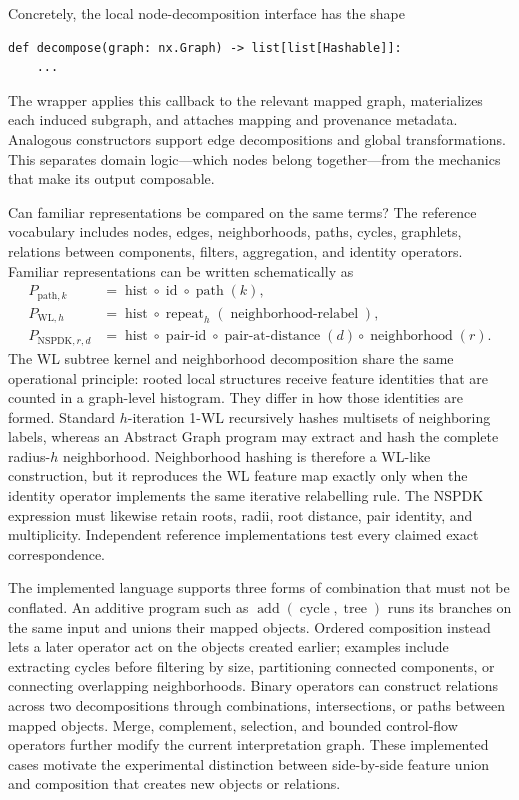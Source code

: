 Concretely, the local node-decomposition interface has the shape
\begin{verbatim}
def decompose(graph: nx.Graph) -> list[list[Hashable]]:
    ...
\end{verbatim}
The wrapper applies this callback to the relevant mapped graph, materializes
each induced subgraph, and attaches mapping and provenance metadata. Analogous
constructors support edge decompositions and global transformations. This
separates domain logic---which nodes belong together---from the mechanics that
make its output composable.

Can familiar representations be compared on the same terms? The reference
vocabulary includes nodes, edges, neighborhoods, paths, cycles,
graphlets, relations between components, filters, aggregation, and identity
operators. Familiar representations can be written schematically as
\begin{align}
 P_{\mathrm{path},k}&=\operatorname{hist}\circ
   \operatorname{id}\circ\operatorname{path}(k),\\
 P_{\mathrm{WL},h}&=\operatorname{hist}\circ
   \operatorname{repeat}_{h}(\operatorname{neighborhood\text{-}relabel}),\\
 P_{\mathrm{NSPDK},r,d}&=\operatorname{hist}\circ
   \operatorname{pair\text{-}id}\circ
   \operatorname{pair\text{-}at\text{-}distance}(d)\circ
   \operatorname{neighborhood}(r).
\end{align}
The WL subtree kernel and neighborhood decomposition share the same operational
principle: rooted local structures receive feature identities that are counted
in a graph-level histogram. They differ in how those identities are formed.
Standard $h$-iteration 1-WL recursively hashes multisets of neighboring labels,
whereas an Abstract Graph program may extract and hash the complete radius-$h$
neighborhood. Neighborhood hashing is therefore a WL-like construction, but it
reproduces the WL feature map exactly only when the identity operator implements
the same iterative relabelling rule. The NSPDK expression must likewise retain
roots, radii, root distance, pair identity, and multiplicity. Independent
reference implementations test every claimed exact correspondence.

The implemented language supports three forms of combination that must not be
conflated. An additive program such as
$\operatorname{add}(\operatorname{cycle},\operatorname{tree})$ runs its
branches on the same input and unions their mapped objects. Ordered composition
instead lets a later operator act on the objects created earlier; examples
include extracting cycles before filtering by size, partitioning connected
components, or connecting overlapping neighborhoods. Binary operators can
construct relations across two decompositions through combinations,
intersections, or paths between mapped objects. Merge, complement, selection,
and bounded control-flow operators further modify the current interpretation
graph. These implemented cases motivate the experimental distinction between
side-by-side feature union and composition that creates new objects or
relations.
